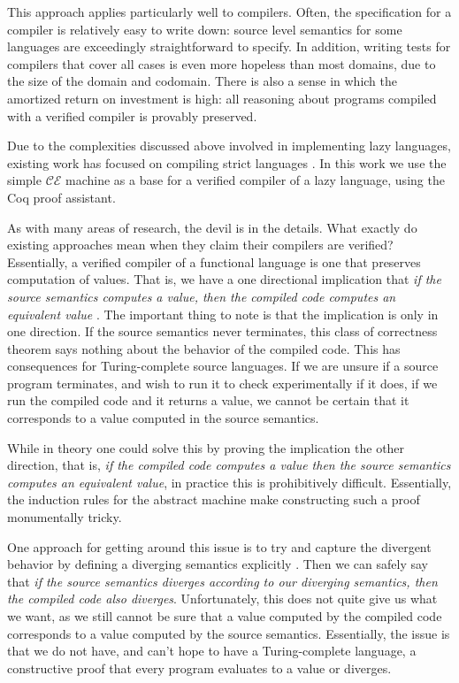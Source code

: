This approach applies particularly well to compilers. Often, the specification
for a compiler is relatively easy to write down: source level semantics for some
languages are exceedingly straightforward to specify. In addition, writing tests 
for compilers that cover all cases is even more hopeless than most domains, due
to the size of the domain and codomain. There is also a sense in which the
amortized return on investment is high: all reasoning about programs compiled
with a verified compiler is provably preserved. 

Due to the complexities discussed above involved in implementing lazy languages,
existing work has focused on compiling strict languages
\cite{chlipala2007certified, leroy2012compcert, cakeml14}. In this work we use
the simple $\mathcal{CE}$ machine as a base for a verified compiler of a lazy
language, using the Coq proof assistant. 

As with many areas of research, the devil is in the details. What exactly do
existing approaches mean when they claim their compilers are verified?
Essentially, a verified compiler of a functional language is one that preserves
computation of values. That is, we have a one directional implication that
\emph{if the source semantics computes a value, then the compiled code computes
an equivalent value} \cite{chlipala2007certified}. The important thing to note is that the
implication is only in one direction. If the source semantics never terminates,
this class of correctness theorem says nothing about the behavior of the
compiled code. This has consequences for Turing-complete source languages. If we
are unsure if a source program terminates, and wish to run it to check
experimentally if it does, if we run the compiled code and it returns a value,
we cannot be certain that it corresponds to a value computed in the source
semantics. 

While in theory one could solve this by proving the implication the other
direction, that is, \emph{if the compiled code computes a value then the source
semantics computes an equivalent value}, in practice this is prohibitively
difficult. Essentially, the induction rules for the abstract machine make
constructing such a proof monumentally tricky. 

One approach for getting around this issue is to try and capture the divergent
behavior by defining a diverging semantics explicitly \cite{functionalbigstep}.
Then we can safely say that \emph{if the source semantics diverges according to
our diverging semantics, then the compiled code also diverges}. Unfortunately,
this does not quite give us what we want, as we still cannot be sure that a value
computed by the compiled code corresponds to a value computed by the source
semantics. Essentially, the issue is that we do not have, and can't hope to have
a Turing-complete language, a constructive proof that every program evaluates to
a value or diverges.  

